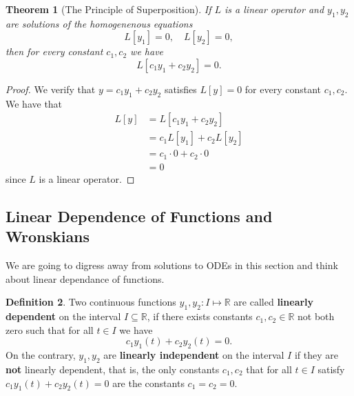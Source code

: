 \documentclass{article}
\theoremstyle{plain}
\newtheorem{thm}{Theorem}[section]
\theoremstyle{definition}
\newtheorem{definition}[thm]{Definition}
\numberwithin{equation}{section}
\begin{document}
\begin{thm}[The Principle of Superposition]
    If $L$ is a linear operator and $y_1,y_2$ are solutions of the homogenenous equations
    \[
        L[y_1] = 0, \quad L[y_2] = 0,
    \]
    then for every constant $c_1,c_2$ we have
    \[
        L[c_1y_1 + c_2y_2] = 0.
    \]
\end{thm}
\begin{proof}
    We verify that $y=c_1y_1 + c_2y_2$ satisfies $L[y] = 0$ for every constant $c_1,c_2.$ We have that
    \begin{align*}
        L[y] &= L[c_1y_1 + c_2y_2] \\
        &= c_1L[y_1] + c_2L[y_2] \\
        &= c_1 \cdot 0 + c_2 \cdot 0 \\
        &= 0
    \end{align*}
    since $L$ is a linear operator.
\end{proof}

\subsection{Linear Dependence of Functions and Wronskians}\label{section:LinearDependence&Wronskians}

We are going to digress away from solutions to ODEs in this section and think about linear dependance of functions.

\begin{definition}
    Two continuous functions $y_1, y_2: I \mapsto \mathbb{R}$ are called \textbf{linearly dependent} on the interval $I \subseteq \mathbb{R}$, if there exists constants $c_1, c_2 \in \mathbb{R}$ not both zero such that for all $t\in I$ we have
    \[
        c_1y_1(t) + c_2y_2(t) = 0.
    \]
    On the contrary, $y_1,y_2$ are \textbf{linearly independent} on the interval $I$ if they are \textbf{not} linearly dependent, that is, the only constants $c_1,c_2$ that for all $t\in I$ satisfy $c_1y_1(t) + c_2y_2(t) = 0$ are the constants $c_1=c_2=0.$
\end{definition}
\end{document}
